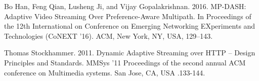 \documentclass{llncs}
\begin{document}


%
%

\begin{thebibliography}{1}
Bo Han, Feng Qian, Lusheng Ji, and Vijay Gopalakrishnan. 2016. MP-DASH: Adaptive Video Streaming Over Preference-Aware Multipath. In Proceedings of the 12th International on Conference on Emerging Networking EXperiments and Technologies (CoNEXT ’16). ACM, New York, NY, USA, 129–143.

Thomas Stockhammer. 2011. Dynamic Adaptive Streaming over HTTP – Design Principles and Standards. MMSys '11 Proceedings of the second annual ACM conference on Multimedia systems. San Jose, CA, USA .133-144.


\end{thebibliography}
\end{document}
